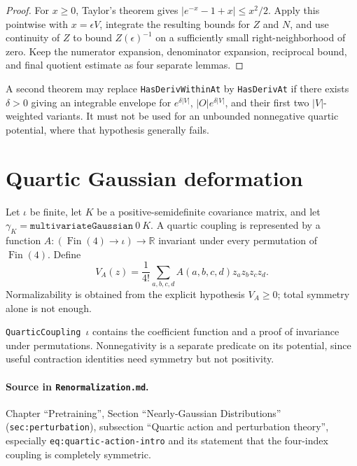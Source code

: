 \begin{proof}
For $x\geq0$, Taylor's theorem gives
$|e^{-x}-1+x|\leq x^2/2$.  Apply this pointwise with $x=\epsilon V$, integrate the resulting bounds
for $Z$ and $N$, and use continuity of $Z$ to bound $Z(\epsilon)^{-1}$ on a sufficiently small
right-neighborhood of zero.  Keep the numerator expansion, denominator expansion, reciprocal
bound, and final quotient estimate as four separate lemmas.
\end{proof}

\begin{remark}
A second theorem may replace \texttt{HasDerivWithinAt} by \texttt{HasDerivAt} if there exists
$\delta>0$ giving an integrable envelope for $e^{\delta|V|}$, $|O|e^{\delta|V|}$, and their first
two $|V|$-weighted variants.  It must not be used for an unbounded nonnegative quartic potential,
where that hypothesis generally fails.
\end{remark}

\section{Quartic Gaussian deformation}

Let $\iota$ be finite, let $K$ be a positive-semidefinite covariance matrix, and let
$\gamma_K=\texttt{multivariateGaussian}\ 0\ K$.  A quartic coupling is represented by a function
$A:(\operatorname{Fin}(4)\to\iota)\to\mathbb R$ invariant under every permutation of
$\operatorname{Fin}(4)$.  Define
\[
 V_A(z)=\frac1{4!}\sum_{a,b,c,d}A(a,b,c,d)z_az_bz_cz_d.
\]
Normalizability is obtained from the explicit hypothesis $V_A\geq0$; total symmetry alone is not
enough.

\begin{definition}
\label{def:renorm:quarticCoupling}
\texttt{QuarticCoupling}~$\iota$ contains the coefficient function and a proof of invariance under
permutations.  Nonnegativity is a separate predicate on its potential, since useful contraction
identities need symmetry but not positivity.

\paragraph{Source in \texttt{Renormalization.md}.}
Chapter ``Pretraining'', Section ``Nearly-Gaussian Distributions'' (\texttt{sec:perturbation}),
subsection ``Quartic action and perturbation theory'', especially
\texttt{eq:quartic-action-intro} and its statement that the four-index coupling is completely
symmetric.
\end{definition}

